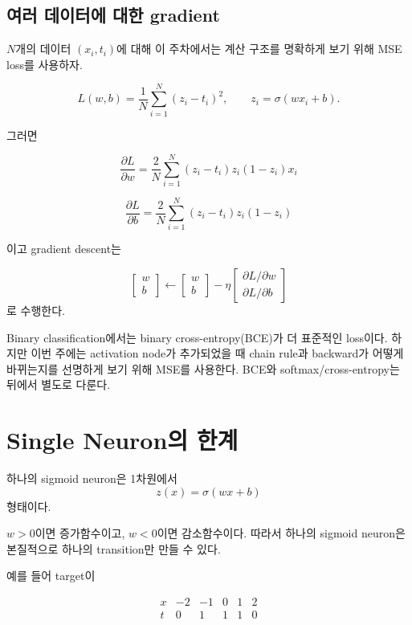 \documentclass[11pt,a4paper]{article}
\newcommand{\sigmoid}{\sigma}
\begin{document}
\subsection{여러 데이터에 대한 gradient}

$N$개의 데이터 $(x_i,t_i)$에 대해 이 주차에서는 계산 구조를 명확하게 보기 위해
MSE loss를 사용하자.

\[
L(w,b)
=
\frac1N\sum_{i=1}^{N}(z_i-t_i)^2,
\qquad
z_i=\sigmoid(wx_i+b).
\]

그러면

\[
\boxed{
\frac{\partial L}{\partial w}
=
\frac{2}{N}
\sum_{i=1}^{N}
(z_i-t_i)z_i(1-z_i)x_i
}
\]

\[
\boxed{
\frac{\partial L}{\partial b}
=
\frac{2}{N}
\sum_{i=1}^{N}
(z_i-t_i)z_i(1-z_i)
}
\]

이고 gradient descent는

\[
\begin{bmatrix}
w\\ b
\end{bmatrix}
\leftarrow
\begin{bmatrix}
w\\ b
\end{bmatrix}
-
\eta
\begin{bmatrix}
\partial L/\partial w\\
\partial L/\partial b
\end{bmatrix}
\]
로 수행한다.

\begin{remarkbox}
Binary classification에서는 binary cross-entropy(BCE)가 더 표준적인 loss이다.
하지만 이번 주에는 activation node가 추가되었을 때 chain rule과 backward가 어떻게 바뀌는지를
선명하게 보기 위해 MSE를 사용한다.
BCE와 softmax/cross-entropy는 뒤에서 별도로 다룬다.
\end{remarkbox}

\section{Single Neuron의 한계}

하나의 sigmoid neuron은 1차원에서
\[
z(x)=\sigmoid(wx+b)
\]
형태이다.

$w>0$이면 증가함수이고,
$w<0$이면 감소함수이다.
따라서 하나의 sigmoid neuron은 본질적으로 하나의 transition만 만들 수 있다.

예를 들어 target이

\[
\begin{array}{c|ccccc}
x & -2 & -1 & 0 & 1 & 2\\
\hline
t & 0 & 1 & 1 & 1 & 0
\end{array}
\]
\end{document}
